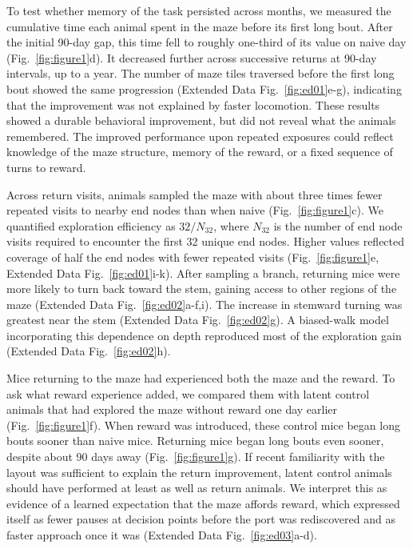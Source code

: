 \documentclass[fleqn,10pt]{wlscirep}
\begin{document}
To test whether memory of the task persisted across months, we measured the cumulative time each animal spent in the maze before its first long bout. After the initial 90-day gap, this time fell to roughly one-third of its value on naive day (Fig.~\ref{fig:figure1}d). It decreased further across successive returns at 90-day intervals, up to a year. The number of maze tiles traversed before the first long bout showed the same progression (Extended Data Fig.~\ref{fig:ed01}e-g), indicating that the improvement was not explained by faster locomotion. These results showed a durable behavioral improvement, but did not reveal what the animals remembered. The improved performance upon repeated exposures could reflect knowledge of the maze structure, memory of the reward, or a fixed sequence of turns to reward. 

Across return visits, animals sampled the maze with about three times fewer repeated visits to nearby end nodes than when naive (Fig.~\ref{fig:figure1}c). We quantified exploration efficiency as $32/N_{32}$, where $N_{32}$ is the number of end node visits required to encounter the first 32 unique end nodes. Higher values reflected coverage of half the end nodes with fewer repeated visits (Fig.~\ref{fig:figure1}e, Extended Data Fig.~\ref{fig:ed01}i-k). After sampling a branch, returning mice were more likely to turn back toward the stem, gaining access to other regions of the maze (Extended Data Fig.~\ref{fig:ed02}a-f,i). The increase in stemward turning was greatest near the stem (Extended Data Fig.~\ref{fig:ed02}g). A biased-walk model incorporating this dependence on depth reproduced most of the exploration gain (Extended Data Fig.~\ref{fig:ed02}h).

Mice returning to the maze had experienced both the maze and the reward. To ask what reward experience added, we compared them with latent control animals that had explored the maze without reward one day earlier (Fig.~\ref{fig:figure1}f). When reward was introduced, these control mice began long bouts sooner than naive mice. Returning mice began long bouts even sooner, despite about 90 days away (Fig.~\ref{fig:figure1}g). If recent familiarity with the layout was sufficient to explain the return improvement, latent control animals should have performed at least as well as return animals. We interpret this as evidence of a learned expectation that the maze affords reward, which expressed itself as fewer pauses at decision points before the port was rediscovered and as faster approach once it was (Extended Data Fig.~\ref{fig:ed03}a-d).
\end{document}
